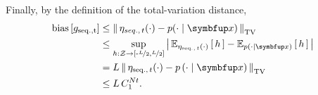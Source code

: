 \begin{proofEnd}
  Finally, by the definition of the total-variation distance, 
 \begin{align}
   \mathrm{bias}\left[ g_{\mathrm{seq., t}} \right]
   &\leq \DTV{\eta_{seq.,\, t}(\cdot)}{p(\cdot\mid\vx)} \\
   &\leq \sup_{h : \mathcal{Z} \rightarrow \left[ \text{-}\nicefrac{L}{2}, \nicefrac{L}{2} \right]} \left|\, \Esub{\eta_{\mathrm{seq.},\, t}(\cdot)}{h} - \Esub{p(\cdot\mid\vx)}{h} \,\right| \\
   &= L \, \DTV{ \eta_{\mathrm{seq.},\, t}(\cdot) }{p\left(\cdot\mid\vx\right)}  \\
   &\leq L \, C_1^{N t}.
 \end{align}
\end{proofEnd}

